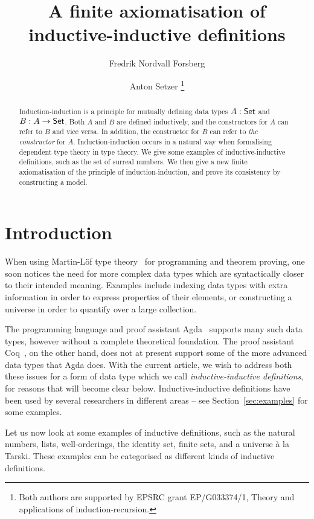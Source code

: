 \documentclass{article}
\title{A finite axiomatisation of inductive-inductive definitions}
\author{Fredrik Nordvall Forsberg}
\author{Anton Setzer \thanks{Both authors are supported by EPSRC grant EP/G033374/1, Theory and applications of induction-recursion.} }
\affil{Swansea University \\
Singleton  Park \\
Swansea SA2 8PP, UK}
\begin{document}
\maketitle

\begin{abstract}
  \noindent 
  Induction-induction is a principle for mutually defining data types
  $A : \mathsf{Set}$ and $B : A \to \mathsf{Set}$. Both $A$ and $B$ are defined
  inductively, and the constructors for $A$ can refer to $B$ and vice
  versa. In addition, the constructor for $B$ can refer to \emph{the
    constructor} for $A$. Induction-induction occurs in a natural way
  when formalising dependent type theory in type theory.  We give some
  examples of inductive-inductive definitions, such as the set of
  surreal numbers. We then give a new finite axiomatisation of the
  principle of induction-induction, and prove its consistency by
  constructing a model.
\end{abstract}

\section{Introduction}
\label{sec:introduction}

When using Martin-L\"of type theory~\cite{martinlof1984bibliopolis}
for programming and theorem proving, one soon notices the need for
more complex data types which are syntactically closer to their intended
meaning. Examples include indexing data types with extra information
in order to express properties of their elements, or constructing a
universe in order to quantify over a large collection.

The programming language and proof assistant
Agda~\cite{norell2007thesis} supports many such data types, however
without a complete theoretical foundation. The proof assistant
Coq~\cite{coq}, on the other hand, does not at present support some of
the more advanced data types that Agda does. With the current article,
we wish to address both these issues for a form of data type which we
call \emph{inductive-inductive definitions}, for reasons that will
become clear below. Inductive-inductive definitions have been used by
several researchers in different areas -- see
Section~\ref{sec:examples} for some examples.

Let us now look at some examples of inductive definitions, such as the
natural numbers, lists, well-orderings, the identity set, finite sets,
and a universe \`a la Tarski. These examples can be categorised as
different kinds of inductive definitions.
\end{document}
